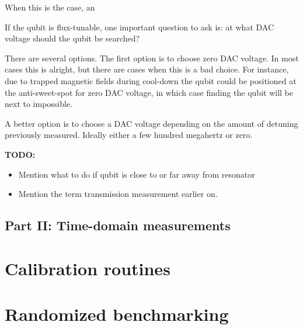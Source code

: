 \documentclass[12pt]{report}
\begin{document}
          When this is the case, an


        If the qubit is flux-tunable, one important question to ask is: at what DAC voltage should the qubit be searched?

        There are several options. The first option is to choose zero DAC voltage. In most cases this is alright, but there are cases when this is a bad choice. For instance, due to trapped magnetic fields during cool-down the qubit could be positioned at the anti-sweet-spot for zero DAC voltage, in which case finding the qubit will be next to impossible.

        A better option is to choose a DAC voltage depending on the amount of detuning previously measured. Ideally either a few hundred megahertz or zero.

        \textbf{TODO:}
        \begin{itemize}
          \item Mention what to do if qubit is close to or far away from resonator
          \item Mention the term transmission measurement earlier on.
        \end{itemize}




    \section{Part II: Time-domain measurements}








  \chapter{Calibration routines}


  \chapter{Randomized benchmarking}
\end{document}
